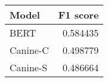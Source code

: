 \begin{tabular}{lr}
\toprule
   Model &  F1 score \\
\midrule
    BERT &  0.584435 \\
Canine-C &  0.498779 \\
Canine-S &  0.486664 \\
\bottomrule
\end{tabular}

